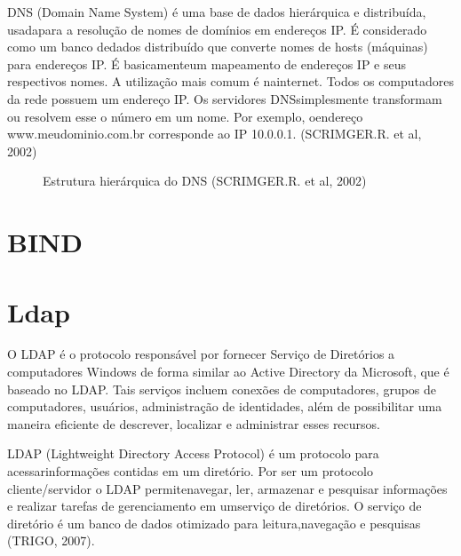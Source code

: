 DNS (Domain Name System) é uma base de dados hierárquica e distribuída, usadapara a resolução de nomes de domínios em endereços IP. É considerado como um banco dedados distribuído que converte nomes de hosts (máquinas) para endereços IP. É basicamenteum mapeamento de endereços IP e seus respectivos nomes. A utilização mais comum é nainternet. Todos os computadores da rede possuem um endereço IP. Os servidores DNSsimplesmente transformam ou resolvem esse o número em um nome. Por exemplo, oendereço www.meudominio.com.br corresponde ao IP 10.0.0.1. (SCRIMGER.R. et al, 2002)

\begin{figure}[ht]
   	\centering
   	\caption{Estrutura hierárquica do DNS (SCRIMGER.R. et al, 2002)}
    \label{dns}
\end{figure}


\section{BIND}

\section{Ldap}

O LDAP é o protocolo responsável por fornecer Serviço de Diretórios a computadores Windows de forma similar ao Active Directory da Microsoft, que é baseado no LDAP. Tais serviços incluem conexões de computadores, grupos de computadores, usuários, administração de identidades, além de possibilitar uma maneira eficiente de descrever, localizar e administrar esses recursos.

LDAP (Lightweight Directory Access Protocol) é um protocolo para acessarinformações contidas em um diretório. Por ser um protocolo cliente/servidor o LDAP permitenavegar, ler, armazenar e pesquisar informações e realizar tarefas de gerenciamento em umserviço de diretórios. O serviço de diretório é um banco de dados otimizado para leitura,navegação e pesquisas (TRIGO, 2007).

